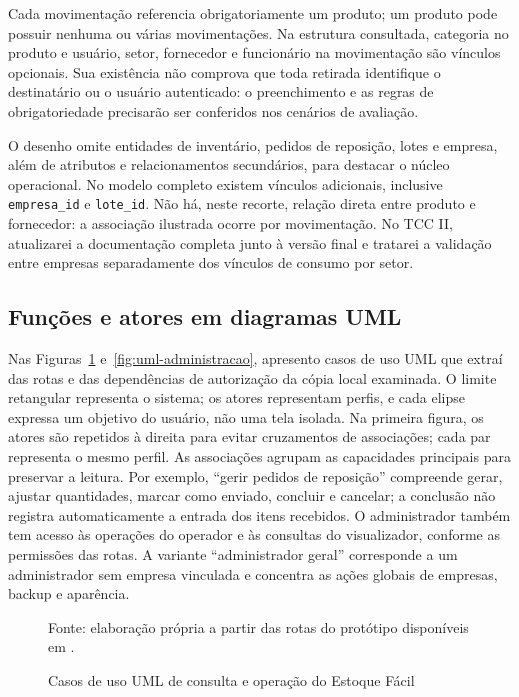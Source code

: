 Cada movimentação referencia obrigatoriamente um produto; um produto pode possuir nenhuma ou várias movimentações. Na estrutura consultada, categoria no produto e usuário, setor, fornecedor e funcionário na movimentação são vínculos opcionais. Sua existência não comprova que toda retirada identifique o destinatário ou o usuário autenticado: o preenchimento e as regras de obrigatoriedade precisarão ser conferidos nos cenários de avaliação.

O desenho omite entidades de inventário, pedidos de reposição, lotes e empresa, além de atributos e relacionamentos secundários, para destacar o núcleo operacional. No modelo completo existem vínculos adicionais, inclusive \texttt{empresa\_id} e \texttt{lote\_id}. Não há, neste recorte, relação direta entre produto e fornecedor: a associação ilustrada ocorre por movimentação. No TCC II, atualizarei a documentação completa junto à versão final e tratarei a validação entre empresas separadamente dos vínculos de consumo por setor.

\subsection{Funções e atores em diagramas UML}
\label{sec:uml-funcoes}

Nas Figuras~\ref{fig:uml-operacao} e~\ref{fig:uml-administracao}, apresento casos de uso UML que extraí das rotas e das dependências de autorização da cópia local examinada. O limite retangular representa o sistema; os atores representam perfis, e cada elipse expressa um objetivo do usuário, não uma tela isolada. Na primeira figura, os atores são repetidos à direita para evitar cruzamentos de associações; cada par representa o mesmo perfil. As associações agrupam as capacidades principais para preservar a leitura. Por exemplo, ``gerir pedidos de reposição'' compreende gerar, ajustar quantidades, marcar como enviado, concluir e cancelar; a conclusão não registra automaticamente a entrada dos itens recebidos. O administrador também tem acesso às operações do operador e às consultas do visualizador, conforme as permissões das rotas. A variante ``administrador geral'' corresponde a um administrador sem empresa vinculada e concentra as ações globais de empresas, backup e aparência.

\begin{figure}[htb]
\centering
\resizebox{\textwidth}{!}{}
\caption{Casos de uso UML de consulta e operação do Estoque Fácil}
\label{fig:uml-operacao}
\par\smallskip
{\footnotesize Fonte: elaboração própria a partir das rotas do protótipo disponíveis em \cite{EstoqueFacilRepositorio}.}
\end{figure}

